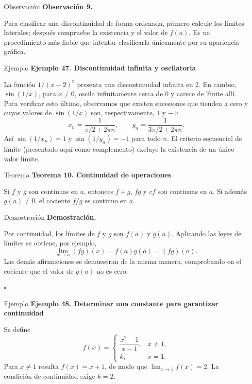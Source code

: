 \documentclass[12pt,aspectratio=169]{beamer}
\begin{document}
\begin{frame}[t,allowframebreaks]{Observación}
{\color{azul}\bfseries Observación 9.}\par\medskip

Para clasificar una discontinuidad de forma ordenada, primero calcule los límites laterales; después compruebe la existencia y el valor de $f(a)$. Es un procedimiento más fiable que intentar clasificarla únicamente por su apariencia gráfica.
\end{frame}


\begin{frame}[t,allowframebreaks]{Ejemplo}
{\color{azul}\bfseries Ejemplo 47. Discontinuidad infinita y oscilatoria}\par\medskip

La función $1/(x-2)^2$ presenta una discontinuidad infinita en $2$. En cambio, $\sin(1/x)$, para $x\ne0$, oscila infinitamente cerca de $0$ y carece de límite allí. Para verificar esto último, observamos que existen sucesiones que tienden a cero y cuyos valores de $\sin(1/x)$ son, respectivamente, $1$ y $-1$:
\[
 x_n=\frac1{\pi/2+2\pi n},\qquad
 y_n=\frac1{3\pi/2+2\pi n}.
\]
Así $\sin(1/x_n)=1$ y $\sin(1/y_n)=-1$ para todo $n$. El criterio secuencial de límite (presentado aquí como complemento) excluye la existencia de un único valor límite.
\end{frame}


\begin{frame}[t,allowframebreaks]{Teorema}
{\color{azul}\bfseries Teorema 10. Continuidad de operaciones}\par\medskip

Si $f$ y $g$ son continuas en $a$, entonces $f+g$, $fg$ y $cf$ son continuas en $a$. Si además $g(a)\ne0$, el cociente $f/g$ es continuo en $a$.
\end{frame}


\begin{frame}[t,allowframebreaks]{Demostración}
{\color{azul}\bfseries Demostración.}\par\smallskip

Por continuidad, los límites de $f$ y $g$ son $f(a)$ y $g(a)$. Aplicando las leyes de límites se obtiene, por ejemplo,
\[
 \lim_{x\to a}(fg)(x)=f(a)g(a)=(fg)(a).
\]
Las demás afirmaciones se demuestran de la misma manera, comprobando en el cociente que el valor de $g(a)$ no es cero.

\hfill $\square$
\end{frame}


\begin{frame}[t,allowframebreaks]{Ejemplo}
{\color{azul}\bfseries Ejemplo 48. Determinar una constante para garantizar continuidad}\par\medskip

Se define
\[
 f(x)=\begin{cases}\dfrac{x^2-1}{x-1},&x\ne1,\\k,&x=1.\end{cases}
\]
Para $x\ne1$ resulta $f(x)=x+1$, de modo que $\lim_{x\to1}f(x)=2$. La condición de continuidad exige $k=\boxed2$.
\end{frame}
\end{document}
